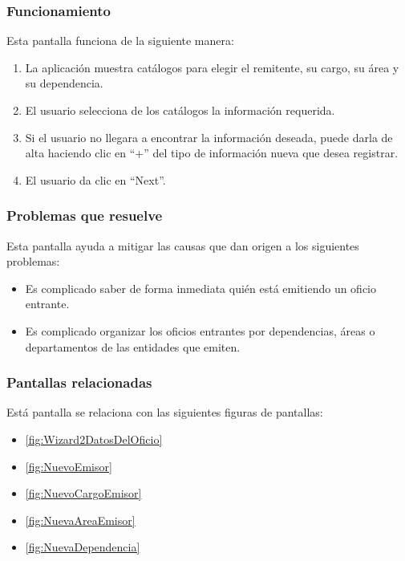 \subsubsection{Funcionamiento}
	Esta pantalla funciona de la siguiente manera:
	
	\begin{enumerate}
		\item La aplicación muestra catálogos para elegir el remitente, su cargo, su área y su dependencia.
		\item El usuario selecciona de los catálogos la información requerida.
		\item Si el usuario no llegara a encontrar la información deseada, puede darla de alta haciendo clic en ``+'' del tipo de información nueva que desea registrar.
		\item El usuario da clic en ``Next''.
	\end{enumerate}

\subsubsection{Problemas que resuelve}
Esta pantalla ayuda a mitigar las causas que dan origen a los siguientes problemas:

	\begin{itemize}
		\item Es complicado saber de forma inmediata quién está emitiendo un oficio entrante.
		\item Es complicado organizar los oficios entrantes por dependencias, áreas o departamentos de las entidades que emiten.
	\end{itemize}

\subsubsection{Pantallas relacionadas}
Está pantalla se relaciona con las siguientes figuras de pantallas:
	\begin{itemize}
		\item \ref{fig:Wizard2DatosDelOficio}
		\item \ref{fig:NuevoEmisor}
		\item \ref{fig:NuevoCargoEmisor}
		\item \ref{fig:NuevaAreaEmisor}
		\item \ref{fig:NuevaDependencia}
	\end{itemize}

